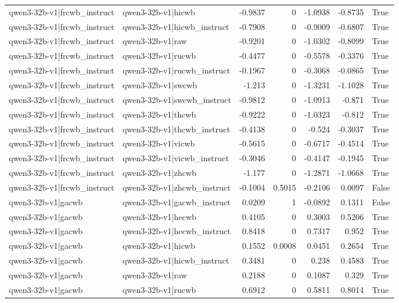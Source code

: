 \begin{table}
\begin{tabular}{l l r r r r l}
qwen3-32b-v1|frcwb_instruct & qwen3-32b-v1|hicwb & -0.9837 & 0 & -1.0938 & -0.8735 & True \\
qwen3-32b-v1|frcwb_instruct & qwen3-32b-v1|hicwb_instruct & -0.7908 & 0 & -0.9009 & -0.6807 & True \\
qwen3-32b-v1|frcwb_instruct & qwen3-32b-v1|raw & -0.9201 & 0 & -1.0302 & -0.8099 & True \\
qwen3-32b-v1|frcwb_instruct & qwen3-32b-v1|rucwb & -0.4477 & 0 & -0.5578 & -0.3376 & True \\
qwen3-32b-v1|frcwb_instruct & qwen3-32b-v1|rucwb_instruct & -0.1967 & 0 & -0.3068 & -0.0865 & True \\
qwen3-32b-v1|frcwb_instruct & qwen3-32b-v1|swcwb & -1.213 & 0 & -1.3231 & -1.1028 & True \\
qwen3-32b-v1|frcwb_instruct & qwen3-32b-v1|swcwb_instruct & -0.9812 & 0 & -1.0913 & -0.871 & True \\
qwen3-32b-v1|frcwb_instruct & qwen3-32b-v1|thcwb & -0.9222 & 0 & -1.0323 & -0.812 & True \\
qwen3-32b-v1|frcwb_instruct & qwen3-32b-v1|thcwb_instruct & -0.4138 & 0 & -0.524 & -0.3037 & True \\
qwen3-32b-v1|frcwb_instruct & qwen3-32b-v1|vicwb & -0.5615 & 0 & -0.6717 & -0.4514 & True \\
qwen3-32b-v1|frcwb_instruct & qwen3-32b-v1|vicwb_instruct & -0.3046 & 0 & -0.4147 & -0.1945 & True \\
qwen3-32b-v1|frcwb_instruct & qwen3-32b-v1|zhcwb & -1.177 & 0 & -1.2871 & -1.0668 & True \\
qwen3-32b-v1|frcwb_instruct & qwen3-32b-v1|zhcwb_instruct & -0.1004 & 0.5015 & -0.2106 & 0.0097 & False \\
qwen3-32b-v1|gacwb & qwen3-32b-v1|gacwb_instruct & 0.0209 & 1 & -0.0892 & 0.1311 & False \\
qwen3-32b-v1|gacwb & qwen3-32b-v1|hecwb & 0.4105 & 0 & 0.3003 & 0.5206 & True \\
qwen3-32b-v1|gacwb & qwen3-32b-v1|hecwb_instruct & 0.8418 & 0 & 0.7317 & 0.952 & True \\
qwen3-32b-v1|gacwb & qwen3-32b-v1|hicwb & 0.1552 & 0.0008 & 0.0451 & 0.2654 & True \\
qwen3-32b-v1|gacwb & qwen3-32b-v1|hicwb_instruct & 0.3481 & 0 & 0.238 & 0.4583 & True \\
qwen3-32b-v1|gacwb & qwen3-32b-v1|raw & 0.2188 & 0 & 0.1087 & 0.329 & True \\
qwen3-32b-v1|gacwb & qwen3-32b-v1|rucwb & 0.6912 & 0 & 0.5811 & 0.8014 & True \\

\end{tabular}
\end{table}
